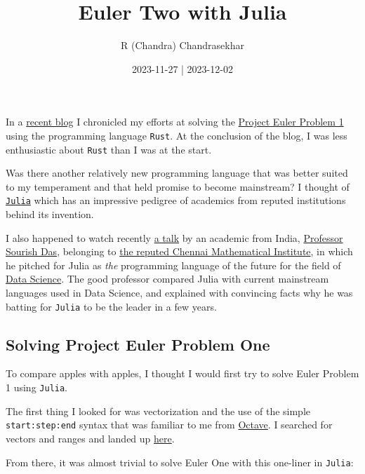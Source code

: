 \documentclass[
  a4paper,
]{article}
\title{Euler Two with Julia}
\author{R (Chandra) Chandrasekhar}
\date{2023-11-27 | 2023-12-02}
\begin{document}
\maketitle

\thispagestyle{empty}


In a
\href{https://swanlotus.netlify.app/blogs/a-foray-into-rust-euler-one}{recent
blog} I chronicled my efforts at solving the
\href{https://projecteuler.net/problem=1}{Project Euler Problem 1} using
the programming language \texttt{Rust}. At the conclusion of the blog, I
was less enthusiastic about \texttt{Rust} than I was at the start.

Was there another relatively new programming language that was better
suited to my temperament and that held promise to become mainstream? I
thought of \href{https://julialang.org/}{\texttt{Julia}} which has an
impressive pedigree of academics from reputed institutions behind its
invention.

I also happened to watch recently
\href{https://www.youtube.com/watch?v=rgcwvrGGFww}{a talk} by an
academic from India,
\href{https://www.cmi.ac.in/people/fac-profile.php?id=sourish}{Professor
Sourish Das}, belonging to \href{https://www.cmi.ac.in/}{the reputed
Chennai Mathematical Institute}, in which he pitched for Julia as
\emph{the} programming language of the future for the field of
\href{https://en.wikipedia.org/wiki/Data_science}{Data Science}. The
good professor compared Julia with current mainstream languages used in
Data Science, and explained with convincing facts why he was batting for
\texttt{Julia} to be the leader in a few years.

\hypertarget{solving-project-euler-problem-one}{%
\subsection{Solving Project Euler Problem
One}\label{solving-project-euler-problem-one}}

To compare apples with apples, I thought I would first try to solve
Euler Problem 1 using \texttt{Julia}.

The first thing I looked for was vectorization and the use of the simple
\texttt{start:step:end} syntax that was familiar to me from
\href{https://octave.org/}{Octave}. I searched for vectors and ranges
and landed up
\href{https://docs.juliahub.com/CalculusWithJulia/AZHbv/0.0.5/precalc/ranges.html}{here}.

From there, it was almost trivial to solve Euler One with this one-liner
in \texttt{Julia}:
\end{document}
